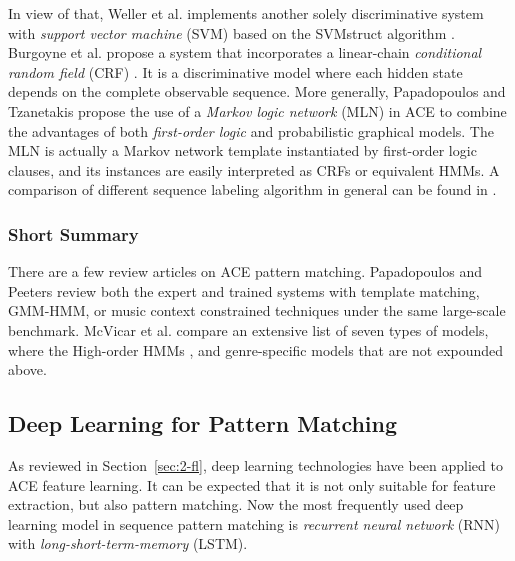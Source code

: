 In view of that, Weller et al. \cite{weller2009structured} implements another solely discriminative system \cite{weller2009structured} with {\it support vector machine} (SVM) \cite{cortes1995support} based on the SVMstruct algorithm \cite{tsochantaridis2005large}. Burgoyne et al. propose a system \cite{burgoyne2007cross} that incorporates a linear-chain {\it conditional random field} (CRF) \cite{lafferty2001conditional}. It is a discriminative model where each hidden state depends on the complete observable sequence. More generally, Papadopoulos and Tzanetakis \cite{papadopoulos2012modeling} propose the use of a {\it Markov logic network} (MLN) \cite{richardson2006markov} in ACE to combine the advantages of both {\it first-order logic} and probabilistic graphical models. The MLN is actually a Markov network template instantiated by first-order logic clauses, and its instances are easily interpreted as CRFs or equivalent HMMs. A comparison of different sequence labeling algorithm in general can be found in \cite{nguyen2007comparisons}.

\subsubsection{Short Summary}
There are a few review articles on ACE pattern matching. Papadopoulos and Peeters \cite{papadopoulos2007large} review both the expert and trained systems with template matching, GMM-HMM, or music context constrained techniques under the same large-scale benchmark. McVicar et al. \cite{mcvicar2014automatic} compare an extensive list of seven types of models, where the High-order HMMs \cite{scholz2009robust,mauch2007discovering,khadkevich2009use,yoshii2011vocabulary}, and genre-specific models \cite{lee2008acoustic,lee2007system} that are not expounded above.

\subsection{Deep Learning for Pattern Matching} \label{sec:2-rnnpm}
As reviewed in Section~\ref{sec:2-fl}, deep learning technologies have been applied to ACE feature learning. It can be expected that it is not only suitable for feature extraction, but also pattern matching. Now the most frequently used deep learning model in sequence pattern matching is {\it recurrent neural network} (RNN) with {\it long-short-term-memory} (LSTM).


